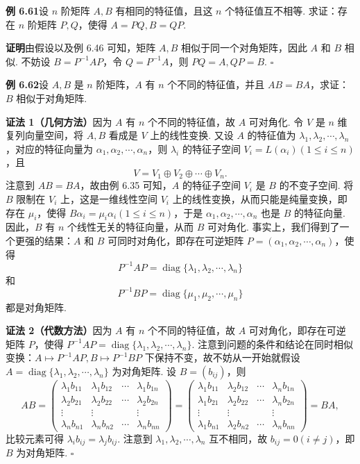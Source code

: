 \documentclass[UTF8,12pt,a4paper,fontset=fandol]{ctexart}
\begin{document}
\noindent\textbf{例 6.61}\quad 设 $n$ 阶矩阵 $A,B$ 有相同的特征值，且这 $n$ 个特征值互不相等. 求证：存在 $n$ 阶矩阵 $P,Q$，使得 $A=PQ,B=QP$.

\noindent\textbf{证明}\quad 由假设以及例 6.46 可知，矩阵 $A,B$ 相似于同一个对角矩阵，因此 $A$ 和 $B$ 相似. 不妨设 $B=P^{-1}AP$，令 $Q=P^{-1}A$，则 $PQ=A,QP=B$. $\square$

\noindent\textbf{例 6.62}\quad 设 $A,B$ 是 $n$ 阶矩阵，$A$ 有 $n$ 个不同的特征值，并且 $AB=BA$，求证：$B$ 相似于对角矩阵.

\noindent\textbf{证法 1（几何方法）}\quad 因为 $A$ 有 $n$ 个不同的特征值，故 $A$ 可对角化. 令 $V$ 是 $n$ 维复列向量空间，将 $A,B$ 看成是 $V$ 上的线性变换. 又设 $A$ 的特征值为 $\lambda_1,\lambda_2,\cdots,\lambda_n$，对应的特征向量为 $\alpha_1,\alpha_2,\cdots,\alpha_n$，则 $\lambda_i$ 的特征子空间 $V_i=L(\alpha_i)(1\le i\le n)$，且
\[
V=V_1\oplus V_2\oplus\cdots\oplus V_n.
\]
注意到 $AB=BA$，故由例 6.35 可知，$A$ 的特征子空间 $V_i$ 是 $B$ 的不变子空间. 将 $B$ 限制在 $V_i$ 上，这是一维线性空间 $V_i$ 上的线性变换，从而只能是纯量变换，即存在 $\mu_i$，使得 $B\alpha_i=\mu_i\alpha_i(1\le i\le n)$，于是 $\alpha_1,\alpha_2,\cdots,\alpha_n$ 也是 $B$ 的特征向量. 因此，$B$ 有 $n$ 个线性无关的特征向量，从而 $B$ 可对角化. 事实上，我们得到了一个更强的结果：$A$ 和 $B$ 可同时对角化，即存在可逆矩阵 $P=(\alpha_1,\alpha_2,\cdots,\alpha_n)$，使得
\[
P^{-1}AP=\operatorname{diag}\{\lambda_1,\lambda_2,\cdots,\lambda_n\}
\]
和
\[
P^{-1}BP=\operatorname{diag}\{\mu_1,\mu_2,\cdots,\mu_n\}
\]
都是对角矩阵.

\noindent\textbf{证法 2（代数方法）}\quad 因为 $A$ 有 $n$ 个不同的特征值，故 $A$ 可对角化，即存在可逆矩阵 $P$，使得 $P^{-1}AP=\operatorname{diag}\{\lambda_1,\lambda_2,\cdots,\lambda_n\}$. 注意到问题的条件和结论在同时相似变换：$A\mapsto P^{-1}AP,B\mapsto P^{-1}BP$ 下保持不变，故不妨从一开始就假设 $A=\operatorname{diag}\{\lambda_1,\lambda_2,\cdots,\lambda_n\}$ 为对角矩阵. 设 $B=(b_{ij})$，则
\[
AB=\left(\begin{array}{cccc}
\lambda_1b_{11} & \lambda_1b_{12} & \cdots & \lambda_1b_{1n}\\
\lambda_2b_{21} & \lambda_2b_{22} & \cdots & \lambda_2b_{2n}\\
\vdots & \vdots & & \vdots\\
\lambda_nb_{n1} & \lambda_nb_{n2} & \cdots & \lambda_nb_{nn}
\end{array}\right)
=\left(\begin{array}{cccc}
\lambda_1b_{11} & \lambda_2b_{12} & \cdots & \lambda_nb_{1n}\\
\lambda_1b_{21} & \lambda_2b_{22} & \cdots & \lambda_nb_{2n}\\
\vdots & \vdots & & \vdots\\
\lambda_1b_{n1} & \lambda_2b_{n2} & \cdots & \lambda_nb_{nn}
\end{array}\right)=BA,
\]
比较元素可得 $\lambda_i b_{ij}=\lambda_j b_{ij}$. 注意到 $\lambda_1,\lambda_2,\cdots,\lambda_n$ 互不相同，故 $b_{ij}=0(i\ne j)$，即 $B$ 为对角矩阵. $\square$
\end{document}
